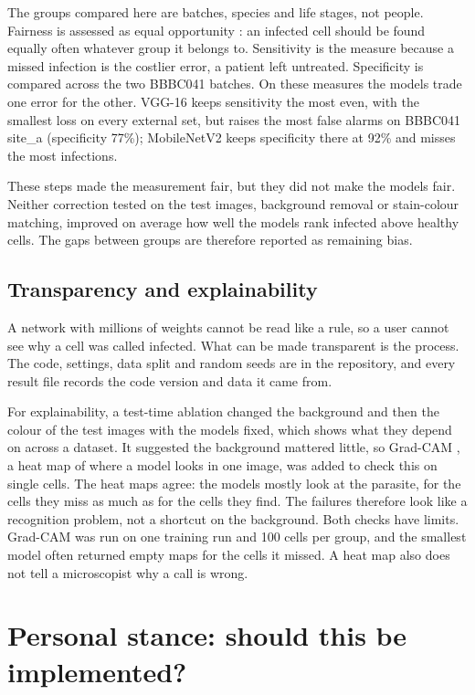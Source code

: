 \documentclass[11pt,a4paper]{article}
\begin{document}
The groups compared here are batches, species and life stages, not people. Fairness is assessed as equal opportunity \citep{hardt2016}: an infected cell should be found equally often whatever group it belongs to. Sensitivity is the measure because a missed infection is the costlier error, a patient left untreated. Specificity is compared across the two BBBC041 batches. On these measures the models trade one error for the other. VGG-16 keeps sensitivity the most even, with the smallest loss on every external set, but raises the most false alarms on BBBC041 site\_a (specificity 77\%); \mbox{MobileNetV2} keeps specificity there at 92\% and misses the most infections.

These steps made the measurement fair, but they did not make the models fair. Neither correction tested on the test images, background removal or stain-colour matching, improved on average how well the models rank infected above healthy cells. The gaps between groups are therefore reported as remaining bias.

\subsection{Transparency and explainability}

A network with millions of weights cannot be read like a rule, so a user cannot see why a cell was called infected. What can be made transparent is the process. The code, settings, data split and random seeds are in the repository, and every result file records the code version and data it came from.

For explainability, a test-time ablation changed the background and then the colour of the test images with the models fixed, which shows what they depend on across a dataset. It suggested the background mattered little, so Grad-CAM \citep{selvaraju2017}, a heat map of where a model looks in one image, was added to check this on single cells. The heat maps agree: the models mostly look at the parasite, for the cells they miss as much as for the cells they find. The failures therefore look like a recognition problem, not a shortcut on the background. Both checks have limits. Grad-CAM was run on one training run and 100 cells per group, and the smallest model often returned empty maps for the cells it missed. A heat map also does not tell a microscopist why a call is wrong.

\section{Personal stance: should this be implemented?}
\end{document}
